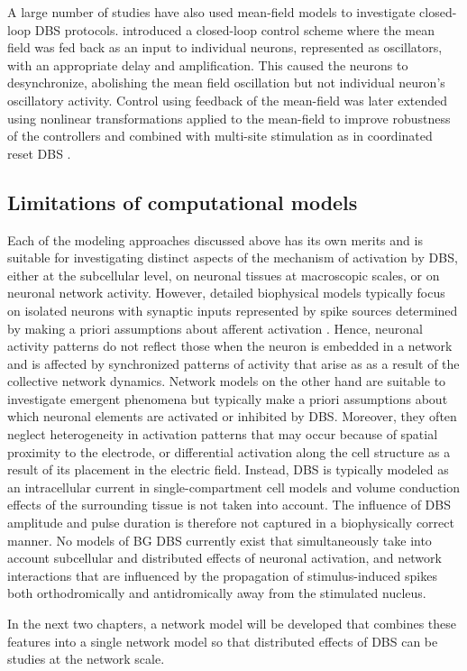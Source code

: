 %
%
%
%
%
%
%
%
%
A large number of studies have also used mean-field models to investigate
closed-loop DBS protocols. \cite{rosenblum_controlling_2004,rosenblum_delayed_2004}
introduced a closed-loop control scheme where the mean field was fed back as
an input to individual neurons, represented as oscillators, with an appropriate delay
and amplification. This caused the neurons to desynchronize, abolishing the mean field
oscillation but not individual neuron's oscillatory activity. Control using
feedback of the mean-field was later extended using nonlinear transformations
applied to the mean-field to improve robustness of the controllers and combined
with multi-site stimulation as in coordinated reset DBS \cite{hauptmann_effectively_2005,popovych_effective_2005,pyragas_controlling_2007,luo_washout_2009,popovych_synchronization_2010}.
%
%

\subsection{Limitations of computational models}
Each of the modeling approaches discussed above has its own merits and is suitable
for investigating distinct aspects of the mechanism of activation by DBS, either at the subcellular
level, on neuronal tissues at macroscopic scales, or on neuronal network activity.
%
However, detailed biophysical models typically focus on isolated neurons
with synaptic inputs represented by spike sources determined by making a priori assumptions
about afferent activation \cite{mcintyre_cellular_2004,miocinovic_computational_2006,johnson_quantifying_2008}.
Hence, neuronal activity patterns do not reflect those when the neuron
is embedded in a network and is affected by synchronized patterns of activity
that arise as as a result of the collective network dynamics.
%
%
Network models on the other hand are suitable to investigate emergent phenomena
but typically make a priori assumptions about which neuronal elements are activated
or inhibited by DBS. Moreover, they often neglect heterogeneity in activation
patterns that may occur because of spatial proximity to the electrode, or differential
activation along the cell structure as a result of its placement in the electric field.
Instead, DBS is typically modeled as an intracellular current in single-compartment cell models
and volume conduction effects of the surrounding tissue is not taken into account.
The influence of DBS amplitude and pulse duration is therefore not captured in a
biophysically correct manner.
%
No models of BG DBS currently exist that simultaneously take into account subcellular
and distributed effects of neuronal activation, and network interactions that
are influenced by the propagation of stimulus-induced spikes both orthodromically
and antidromically away from the stimulated nucleus.


In the next two chapters, a network model will be developed that combines these
features into a single network model so that distributed effects of DBS can
be studies at the network scale.

%
%
%
%
%
%
%
%
%
%
%
%
%
%
%
%
%
%
%
%
%


%
%
%
%
%
%
%
%
%
%
%
%
%
%
%

%
%
%
%
%
%
%
%
%
%
%
%
%
%
%
%
%

%
%
%
%
%
